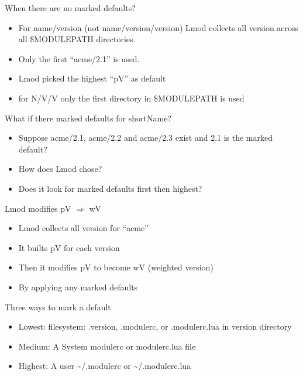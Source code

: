 \documentclass{beamer}
\begin{document}
\begin{frame}{When there are no marked defaults?}
  \begin{itemize}
    \item For name/version (not name/version/version) Lmod collects
      all version across all \$MODULEPATH directories.
    \item Only the first ``acme/2.1'' is used.
    \item Lmod picked the highest ``pV'' as default
    \item for N/V/V only the first directory in \$MODULEPATH is used
  \end{itemize}
\end{frame}

\begin{frame}{What if there marked defaults for shortName?}
  \begin{itemize}
    \item Suppose acme/2.1, acme/2.2 and acme/2.3 exist and 2.1 is the
      marked default?
    \item How does Lmod chose?
    \item Does it look for marked defaults first then highest?
  \end{itemize}
\end{frame}

\begin{frame}{Lmod modifies pV $\Rightarrow$ wV}
  \begin{itemize}
    \item Lmod collects all version for ``acme''
    \item It builts pV for each version
    \item Then it modifies pV to become wV (weighted version)
    \item By applying any marked defaults
  \end{itemize}
\end{frame}

\begin{frame}{Three ways to mark a default}
  \begin{itemize}
    \item Lowest: filesystem: .version, .modulerc, or .modulerc.lua in version
      directory
    \item Medium: A System modulerc or modulerc.lua file
    \item Highest: A user \textasciitilde{}/.modulerc or \textasciitilde{}/.modulerc.lua
  \end{itemize}
\end{frame}
\end{document}

